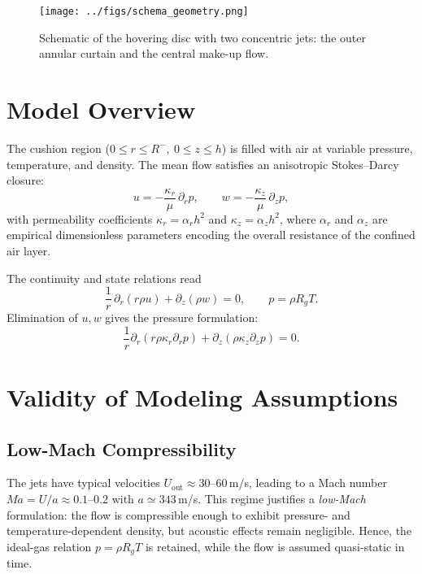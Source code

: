\documentclass[11pt,a4paper]{article}
\begin{document}
\begin{figure}[t]
  \centering
  \texttt{[image: ../figs/schema\_geometry.png]}
  \caption{Schematic of the hovering disc with two concentric jets: the outer annular curtain and the central make-up flow.}
  \label{fig:geometry}
\end{figure}

\section{Model Overview}
The cushion region ($0\le r\le R^{-},\ 0\le z\le h$) is filled with air at variable pressure, temperature, and density. 
The mean flow satisfies an anisotropic Stokes--Darcy closure:
\begin{equation}
  u = -\frac{\kappa_r}{\mu}\,\partial_r p,\qquad
  w = -\frac{\kappa_z}{\mu}\,\partial_z p,
\end{equation}
with permeability coefficients $\kappa_r=\alpha_r h^2$ and $\kappa_z=\alpha_z h^2$, where $\alpha_r$ and $\alpha_z$ are empirical dimensionless parameters encoding the overall resistance of the confined air layer.

The continuity and state relations read
\begin{equation}
  \frac{1}{r}\,\partial_r\!\left(r\rho u\right)+\partial_z(\rho w)=0,\qquad
  p=\rho R_g T.
\end{equation}
Elimination of $u,w$ gives the pressure formulation:
\begin{equation}
  \frac{1}{r}\partial_r(r\rho\kappa_r\partial_r p)+\partial_z(\rho\kappa_z\partial_z p)=0.
\end{equation}

\section{Validity of Modeling Assumptions}
\subsection{Low-Mach Compressibility}
The jets have typical velocities $U_{\mathrm{out}}\approx30$--$60\,$m/s, leading to a Mach number $Ma=U/a\approx0.1$--$0.2$ with $a\simeq343\,$m/s. 
This regime justifies a \emph{low-Mach} formulation: the flow is compressible enough to exhibit pressure- and temperature-dependent density, but acoustic effects remain negligible. 
Hence, the ideal-gas relation $p=\rho R_g T$ is retained, while the flow is assumed quasi-static in time.
\end{document}
